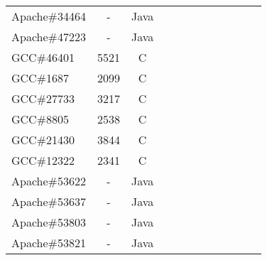 \begin{table*}[h!]
\begin{tabular}{lccccccccccc}
    Apache\#34464     &  -  & Java  &  &              &    &                                 &                   &                           &                    &&           \\
    Apache\#47223     &  -  & Java  &  &              &    &                                 &                   &                           &                    &&           \\
    \midrule
    GCC\#46401        &  5521  & C  &  &              &    &                                 &                   &                           &                    &&            \\
    GCC\#1687         &  2099  & C  &  &              &    &                                 &                   &                           &                    &&           \\
    GCC\#27733        &  3217  & C  &  &              &    &                                 &                   &                           &                    &&           \\
    GCC\#8805         &  2538  & C  &  &              &    &                                 &                   &                           &                    &&            \\
    GCC\#21430        &  3844  & C  &  &              &    &                                 &                   &                           &                    &&            \\
    GCC\#12322        &  2341  & C  &  &              &    &                                 &                   &                           &                    &&           \\
    \midrule
    \midrule
    Apache\#53622     &  -  & Java  &  &              &    &                                 &                   &                           &                    &&           \\
    Apache\#53637     &  -  & Java  &  &              &    &                                 &                   &                           &                    &&          \\
    Apache\#53803     &  -  & Java  &  &              &    &                                 &                   &                           &                    &&            \\
    Apache\#53821     &  -  & Java  &  &              &    &                                 &                   &                           &                    &&           \\

\end{tabular}
\end{table*}
